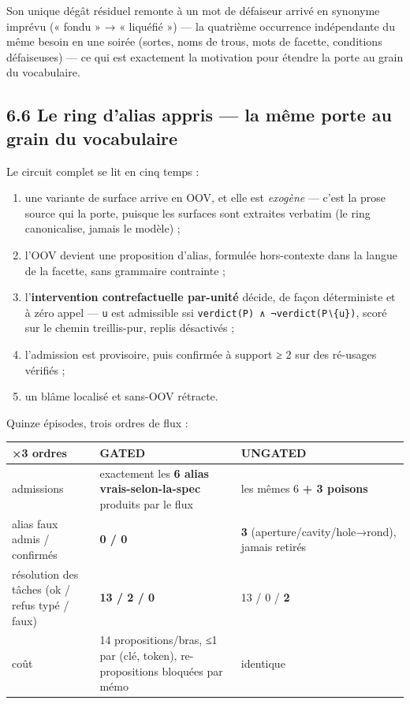 \documentclass[11pt]{article}
\begin{document}
Son unique dégât résiduel remonte à un mot de défaiseur arrivé en synonyme imprévu (« fondu » → « liquéfié ») — la quatrième occurrence indépendante du même besoin en une soirée (sortes, noms de trous, mots de facette, conditions défaiseuses) — ce qui est exactement la motivation pour étendre la porte au grain du vocabulaire.

\subsection*{6.6 Le ring d'alias appris — la même porte au grain du vocabulaire}

Le circuit complet se lit en cinq temps :

\begin{enumerate}
\item une variante de surface arrive en OOV, et elle est \emph{exogène} — c'est la prose source qui la porte, puisque les surfaces sont extraites verbatim (le ring canonicalise, jamais le modèle) ;
\item l'OOV devient une proposition d'alias, formulée hors-contexte dans la langue de la facette, sans grammaire contrainte ;
\item l'\textbf{intervention contrefactuelle par-unité} décide, de façon déterministe et à zéro appel — \texttt{u} est admissible ssi \texttt{verdict(P) ∧ ¬verdict(P∖\{u\})}, scoré sur le chemin treillis-pur, replis désactivés ;
\item l'admission est provisoire, puis confirmée à support ≥ 2 sur des ré-usages vérifiés ;
\item un blâme localisé et sans-OOV rétracte.
\end{enumerate}

Quinze épisodes, trois ordres de flux :

\begin{center}\small\begin{tabular}{lll}\toprule
×3 ordres & GATED & UNGATED \\ \midrule
admissions & exactement les \textbf{6 alias vrais-selon-la-spec} produits par le flux & les mêmes 6 \textbf{+ 3 poisons} \\
alias faux admis / confirmés & \textbf{0 / 0} & \textbf{3} (aperture/cavity/hole→rond), jamais retirés \\
résolution des tâches (ok / refus typé / faux) & \textbf{13 / 2 / 0} & 13 / 0 / \textbf{2} \\
coût & 14 propositions/bras, ≤1 par (clé, token), re-propositions bloquées par mémo & identique \\
\bottomrule\end{tabular}\end{center}
\end{document}
